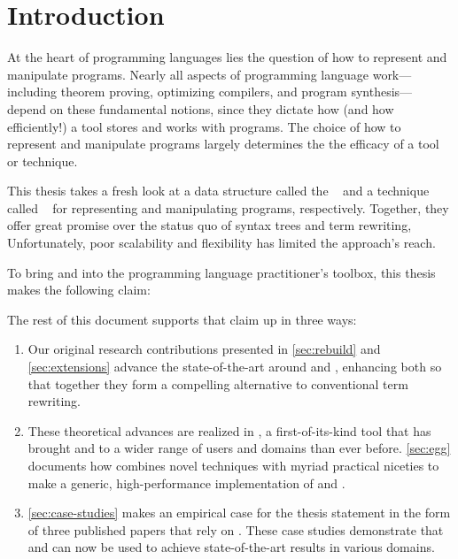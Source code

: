 \chapter{Introduction}
\label{sec:intro}

At the heart of programming languages
 lies the question of how to represent and manipulate programs.
Nearly all aspects of programming language work---including
 theorem proving, optimizing compilers, and program synthesis---%
 depend on these fundamental notions,
 since they dictate
 how (and how efficiently!) a tool
 stores and works with programs.
The choice of how to represent and manipulate programs
 largely determines the the efficacy of a tool or technique.

This thesis takes a fresh look at a data structure called the
 \textit{\egraph}~\cite{nelson}
 and a technique called \textit{\eqsat}~\cite{eqsat}
 for representing and manipulating programs, respectively.
Together,
 they offer great promise over the status quo of
 syntax trees and term rewriting,
Unfortunately,
 poor scalability and flexibility
 has limited the approach's reach.

To bring \egraphs and \eqsat into
 the programming language practitioner's toolbox,
 this thesis makes the following claim:
\begin{quote}
    \it\Thesisstmt
\end{quote}

The rest of this document
 supports that claim up in
 three ways:
\begin{enumerate}
\item
Our original research contributions presented in
 \autoref{sec:rebuild} and \autoref{sec:extensions}
 advance the state-of-the-art around
 \egraphs and \eqsat,
 enhancing both so that together they form a compelling
 alternative to conventional term rewriting.
\item
These theoretical advances
 are realized in \egg,
 a first-of-its-kind tool
 that has brought \egraphs and \eqsat
 to a wider range of users and domains than ever before.
\autoref{sec:egg} documents how \egg
 combines novel techniques with myriad practical niceties
 to make a generic, high-performance implementation of
 \egraphs and \eqsat.
\item
\autoref{sec:case-studies}
 makes an empirical case for the thesis statement
 in the form of three published papers that rely on \egg.
These case studies demonstrate that \egraphs and \eqsat
 can now be used to
 achieve state-of-the-art results in various domains.
\end{enumerate}

